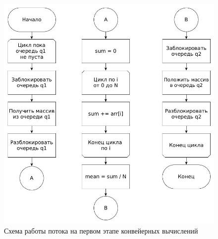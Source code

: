 \FloatBarrier
\begin{figure}[hp]
	\label{classic}
	\begin{center}
		\includegraphics[width=\linewidth]{graph/ex1.jpg}
	\end{center}
	\caption{Схема работы потока на первом этапе конвейерных вычислений}
\end{figure}
\FloatBarrier

